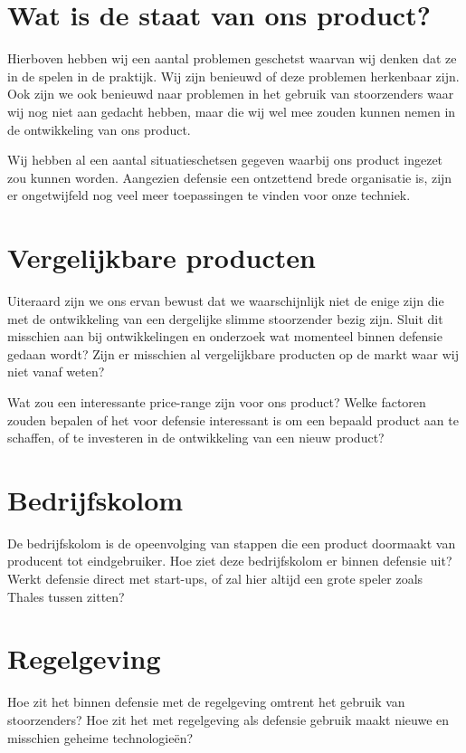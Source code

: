 \documentclass[oneside, a4paper, openany]{memoir}
\begin{document}
\section{Wat is de staat van ons product?}
Hierboven hebben wij een aantal problemen geschetst waarvan wij denken dat ze in de spelen in de praktijk. Wij zijn benieuwd of deze problemen herkenbaar zijn. Ook zijn we ook benieuwd naar problemen in het gebruik van stoorzenders waar wij nog niet aan gedacht hebben, maar die wij wel mee zouden kunnen nemen in de ontwikkeling van ons product.

Wij hebben al een aantal situatieschetsen gegeven waarbij ons product ingezet zou kunnen worden. Aangezien defensie een ontzettend brede organisatie is, zijn er ongetwijfeld nog veel meer toepassingen te vinden voor onze techniek.

\section{Vergelijkbare producten}
Uiteraard zijn we ons ervan bewust dat we waarschijnlijk niet de enige zijn die met de ontwikkeling van een dergelijke slimme stoorzender bezig zijn. Sluit dit misschien aan bij ontwikkelingen en onderzoek wat momenteel binnen defensie gedaan wordt? Zijn er misschien al vergelijkbare producten op de markt waar wij niet vanaf weten?

Wat zou een interessante price-range zijn voor ons product? Welke factoren zouden bepalen of het voor defensie interessant is om een bepaald product aan te schaffen, of te investeren in de ontwikkeling van een nieuw product?

\section{Bedrijfskolom}
De bedrijfskolom is de opeenvolging van stappen die een product doormaakt van producent tot eindgebruiker. Hoe ziet deze bedrijfskolom er binnen defensie uit? Werkt defensie direct met start-ups, of zal hier altijd een grote speler zoals  Thales tussen zitten?

\section{Regelgeving}
Hoe zit het binnen defensie met de regelgeving omtrent het gebruik van stoorzenders? Hoe zit het met regelgeving als defensie gebruik maakt nieuwe en misschien geheime technologieën?

\backmatter
\printbibliography
\end{document}
